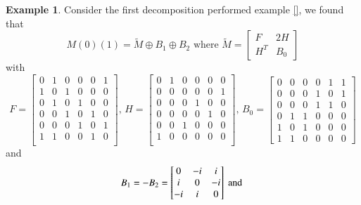 \documentclass[preprint,12pt]{elsarticle}
\theoremstyle{definition}
\newtheorem{example}[thm]{Example}
\theoremstyle{remark}
\begin{document}
\begin{example}
Consider the first decomposition performed example \ref{}, we found that $$M(0)(1)=\tilde{M}\oplus B_1\oplus B_2\text{ where } \tilde{M}=\left[\begin{matrix}
F & 2H \\
H^T & B_0 \end{matrix}\right]$$ with$$F=\left[
\begin{matrix}
0 & 1 & 0 & 0 & 0 & 1\\
1 & 0 & 1 & 0 & 0 & 0\\
0 & 1 & 0 & 1 & 0 & 0\\
0 & 0 & 1 & 0 & 1 & 0\\
0 & 0 & 0 & 1 & 0 & 1\\
1 & 1 & 0 & 0 & 1 & 0\\
\end{matrix}\right] \text{, }H=\left[\begin{matrix}
0 & 1 & 0 & 0 & 0 & 0\\
0 & 0 & 0 & 0 & 0 & 1\\
0 & 0 & 0 & 1 & 0 & 0\\
0 & 0 & 0 & 0 & 1 & 0\\
0 & 0 & 1 & 0 & 0 & 0\\
1 & 0 & 0 & 0 & 0 & 0\\
\end{matrix}\right] \text{, }B_0=\left[\begin{matrix}
0 & 0 & 0 & 0 & 1 & 1\\
0 & 0 & 0 & 1 & 0 & 1\\
0 & 0 & 0 & 1 & 1 & 0\\
0 & 1 & 1 & 0 & 0 & 0\\
1 & 0 & 1 & 0 & 0 & 0\\
1 & 1 & 0 & 0 & 0 & 0\end{matrix}\right]$$ and $$
B_1=-B_2=\left[\begin{matrix} 0 & -i & i \\ i& 0 & -i \\ -i &i & 0 \end{matrix}\right]\\
\text{ and }$$


\end{example}
\end{document}
